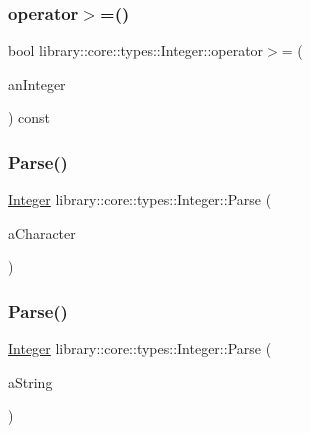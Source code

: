 \subsubsection{\texorpdfstring{operator$>$=()}{operator>=()}\hspace{0.1cm}{\footnotesize\ttfamily [2/2]}}
{\footnotesize\ttfamily bool library\+::core\+::types\+::\+Integer\+::operator$>$= (\begin{DoxyParamCaption}\item[{const \hyperlink{classlibrary_1_1core_1_1types_1_1_integer_a623afb1580f870fd8a1997b1c12c917d}{Integer\+::\+Value\+Type} \&}]{an\+Integer }\end{DoxyParamCaption}) const}

\mbox{\label{classlibrary_1_1core_1_1types_1_1_integer_aaa5f55222db9aeb9ad7fcd8a69109f9d}} 
\subsubsection{\texorpdfstring{Parse()}{Parse()}\hspace{0.1cm}{\footnotesize\ttfamily [1/2]}}
{\footnotesize\ttfamily \hyperlink{classlibrary_1_1core_1_1types_1_1_integer}{Integer} library\+::core\+::types\+::\+Integer\+::\+Parse (\begin{DoxyParamCaption}\item[{char}]{a\+Character }\end{DoxyParamCaption})\hspace{0.3cm}{\ttfamily [static]}}

\mbox{\label{classlibrary_1_1core_1_1types_1_1_integer_a12084c5a23b58ab8f3d28bf69f579253}} 
\subsubsection{\texorpdfstring{Parse()}{Parse()}\hspace{0.1cm}{\footnotesize\ttfamily [2/2]}}
{\footnotesize\ttfamily \hyperlink{classlibrary_1_1core_1_1types_1_1_integer}{Integer} library\+::core\+::types\+::\+Integer\+::\+Parse (\begin{DoxyParamCaption}\item[{const \hyperlink{classlibrary_1_1core_1_1types_1_1_string}{types\+::\+String} \&}]{a\+String }\end{DoxyParamCaption})\hspace{0.3cm}{\ttfamily [static]}}

